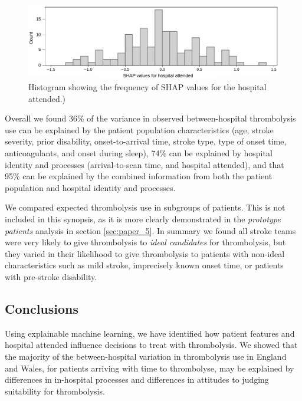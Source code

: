 \begin{figure}
    \centering
    \includegraphics[width=1\linewidth]{images/p2_hosp_shap.jpg}
    \caption{Histogram showing the frequency of SHAP values for the hospital attended.)}
    \label{fig:hospital_shap}
\end{figure}

Overall we found 36\% of the variance in observed between-hospital thrombolysis use can be explained by the patient population characteristics (age, stroke severity, prior disability, onset-to-arrival time, stroke type, type of onset time, anticoagulants, and onset during sleep), 74\% can be explained by hospital identity and processes (arrival-to-scan time, and hospital attended), and that 95\% can be explained by the combined information from both the patient population and hospital identity and processes.

We compared expected thrombolysis use in subgroups of patients. This is not included in this synopsis, as it is more clearly demonstrated in the \textit{prototype patients} analysis in section \ref{sec:paper_5}. In summary we found all stroke teams were very likely to give thrombolysis to \textit{ideal candidates} for thrombolysis, but they varied in their likelihood to give thrombolysis to patients with non-ideal characteristics such as mild stroke, imprecisely known onset time, or patients with pre-stroke disability. 

\subsection{Conclusions}

Using explainable machine learning, we have identified how patient features and hospital attended influence decisions to treat with thrombolysis. We showed that the majority of the between-hospital variation in thrombolysis use in England and Wales, for patients arriving with time to thrombolyse, may be explained by differences in in-hospital processes and differences in attitudes to judging suitability for thrombolysis.